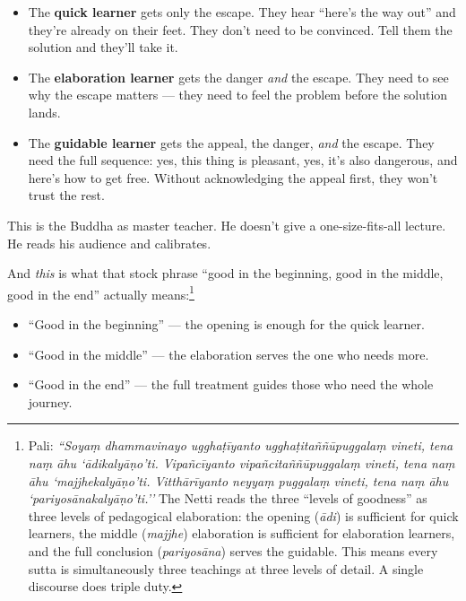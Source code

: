 \begin{itemize}[itemsep=6pt]
\item The \textbf{quick learner} gets only the escape. They hear ``here's the way out'' and they're already on their feet. They don't need to be convinced. Tell them the solution and they'll take it.

\item The \textbf{elaboration learner} gets the danger \textit{and} the escape. They need to see why the escape matters --- they need to feel the problem before the solution lands.

\item The \textbf{guidable learner} gets the appeal, the danger, \textit{and} the escape. They need the full sequence: yes, this thing is pleasant, yes, it's also dangerous, and here's how to get free. Without acknowledging the appeal first, they won't trust the rest.
\end{itemize}

This is the Buddha as master teacher. He doesn't give a one-size-fits-all lecture. He reads his audience and calibrates.

And \textit{this} is what that stock phrase ``good in the beginning, good in the middle, good in the end'' actually means:\footnote{Pali: \textit{``Soyaṃ dhammavinayo ugghaṭīyanto ugghaṭitaññūpuggalaṃ vineti, tena naṃ āhu `ādikalyāṇo'ti. Vipañcīyanto vipañcitaññūpuggalaṃ vineti, tena naṃ āhu `majjhekalyāṇo'ti. Vitthārīyanto neyyaṃ puggalaṃ vineti, tena naṃ āhu `pariyosānakalyāṇo'ti.''} The Netti reads the three ``levels of goodness'' as three levels of pedagogical elaboration: the opening (\textit{ādi}) is sufficient for quick learners, the middle (\textit{majjhe}) elaboration is sufficient for elaboration learners, and the full conclusion (\textit{pariyosāna}) serves the guidable. This means every sutta is simultaneously three teachings at three levels of detail. A single discourse does triple duty.}

\begin{itemize}[itemsep=4pt]
\item ``Good in the beginning'' --- the opening is enough for the quick learner.
\item ``Good in the middle'' --- the elaboration serves the one who needs more.
\item ``Good in the end'' --- the full treatment guides those who need the whole journey.
\end{itemize}

